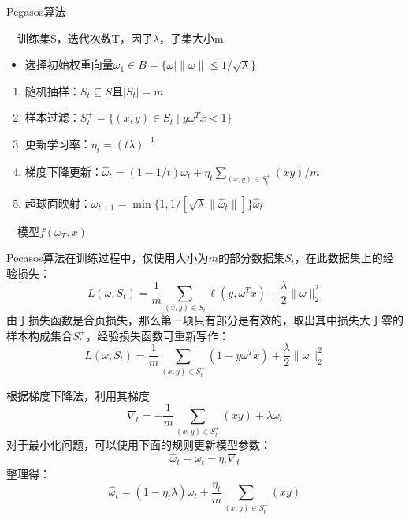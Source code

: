 \begin{algorithm}[htbp]
        \caption{Pegasos算法}
        \begin{algorithmic}
            \REQUIRE ~~训练集S，迭代次数T，因子$\lambda$，子集大小m \\
            \STATE
            \begin{itemize}
              \item 选择初始权重向量$\omega_1\in B=\{\omega\mid \|\omega\| \le 1/\sqrt{\lambda}\}$
            \end{itemize}
            \STATE
            \begin{enumerate}
              \item 随机抽样：$S_t\subseteq S$且$|S_t|=m$
              \item 样本过滤：$S_t^{+}=\{(x,y)\in S_t\mid y \omega^T x < 1\}$
              \item 更新学习率：$\eta_t = (t\lambda)^{-1}$
              \item 梯度下降更新：$\hat \omega_t = (1-1/t)\omega_t + \eta_t \sum\limits_{(x,y)\in S_t^{+}} (xy)/m$
              \item 超球面映射：$\omega_{t+1} = \min\big\{1, 1/[\sqrt{\lambda}\|\hat \omega_t\|]\big\} \hat \omega_t$
            \end{enumerate}
            \ENDFOR
            \ENSURE ~~模型$f(\omega_T,x)$
        \end{algorithmic}
\end{algorithm}

Pecasos算法在训练过程中，仅使用大小为$m$的部分数据集$S_t$，在此数据集上的经验损失：
\begin{equation}
    L(\omega, S_t) = \frac{1}{m} \sum\limits_{(x,y)\in S_t} \ell(y,\omega^T x) + \frac{\lambda}{2} \|\omega\|_2^2
\end{equation}
由于损失函数是合页损失，那么第一项只有部分是有效的，取出其中损失大于零的样本构成集合$S_t^{+}$，经验损失函数可重新写作：
\begin{equation}
    L(\omega, S_t) = \frac{1}{m} \sum\limits_{(x,y)\in S_t^{+}} (1- y \omega^T x) + \frac{\lambda}{2} \|\omega\|_2^2
\end{equation}

根据梯度下降法，利用其梯度
\begin{equation}
    \nabla_t = -\frac{1}{m} \sum\limits_{(x,y)\in S_t^{+}} (xy) + \lambda \omega_t
\end{equation}
对于最小化问题，可以使用下面的规则更新模型参数：
\begin{equation}
    \hat \omega_t = \omega_t - \eta_t \nabla_t
\end{equation}
整理得：
\begin{equation}
    \hat \omega_t = (1-\eta_t \lambda)\omega_t + \frac{\eta_t}{m} \sum\limits_{(x,y)\in S_t^{+}} (xy)
\end{equation}

